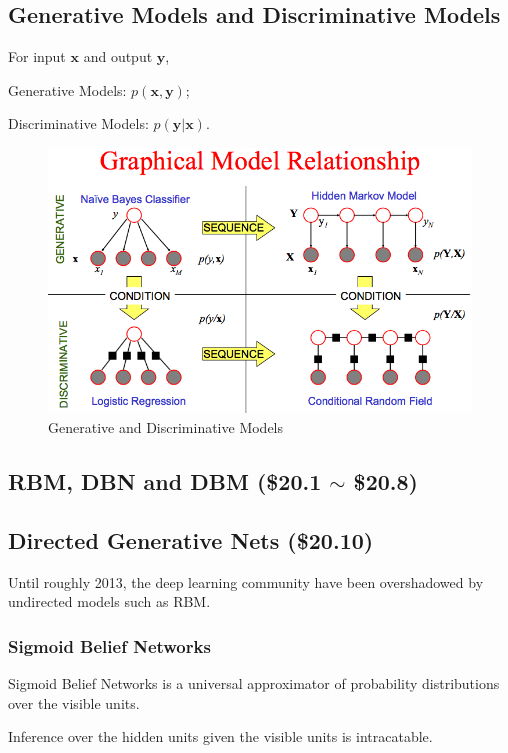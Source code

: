 \documentclass[12pt]{article}
\numberwithin{equation}{section}
\begin{document}
\subsection{Generative Models and Discriminative Models\citep{ng2002discriminative}}
	For input $\bm{x}$ and output $\bm{y}$, \par
	Generative Models: $p(\bm{x,y})$; \par
	Discriminative Models: $p(\bm{y|x})$. \par
	\par
	\begin{figure}[H]
		\includegraphics[width=\linewidth]{fig_DL/generative_discriminative_models.png}
		\caption{Generative and Discriminative Models}
		\label{fig:generative_discriminative_models}
	\end{figure}
\subsection{RBM, DBN and DBM (\$20.1 $\sim$ \$20.8)}
\subsection{Directed Generative Nets (\$20.10)}
	Until roughly 2013, the deep learning community have been overshadowed by undirected models such as RBM.
\subsubsection{Sigmoid Belief Networks}
	Sigmoid Belief Networks is a universal approximator of  probability distributions over the visible units.\par
	Inference over the hidden units given the visible units is intracatable.\par
\end{document}
